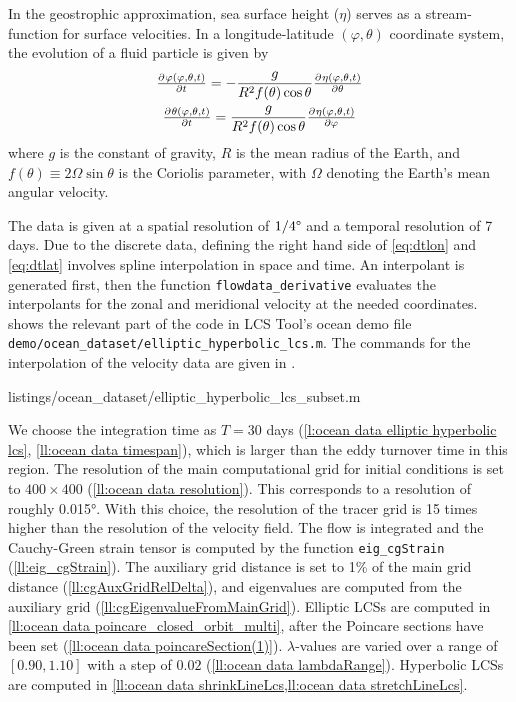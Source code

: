 \documentclass[5p]{elsarticle}
\begin{document}
In the geostrophic approximation, sea surface height ($\eta$) serves as a stream-function for surface velocities. In a longitude-latitude $(\varphi,\theta)$ coordinate system, the evolution of a fluid particle is given by
\begin{gather}
\pd{\varphi(\varphi,\theta,t)}{t} = -\frac{g}{R^2 f(\theta) \cos\theta} \pd{\eta(\varphi,\theta,t)}{\theta}\label{eq:dtlon}\\
\pd{\theta(\varphi,\theta,t)}{t} = \frac{g}{R^2 f(\theta) \cos\theta}\pd{\eta(\varphi,\theta,t)}{\varphi}
\label{eq:dtlat}
\end{gather}
where $g$ is the constant of gravity, $R$ is the mean radius of the Earth, and $f(\theta) \equiv 2\Omega\sin\theta$ is the Coriolis parameter, with $\Omega$ denoting the Earth's mean angular velocity.

The data is given at a spatial resolution of $1/4\degree$ and a temporal resolution of 7 days.
Due to the discrete data, defining the right hand side of \cref{eq:dtlon} and \cref{eq:dtlat} involves spline interpolation in space and time.
An interpolant is generated first, then the function \lstinline!flowdata_derivative! evaluates the interpolants for the zonal and meridional velocity at the needed coordinates.
 shows the relevant part of the code in LCS Tool's ocean demo file \lstinline!demo/ocean_dataset/elliptic_hyperbolic_lcs.m!.
The commands for the interpolation of the velocity data are given in .


        {listings/ocean_dataset/elliptic_hyperbolic_lcs_subset.m}

We choose the integration time as $T=30$ days (\cref{l:ocean data elliptic hyperbolic lcs}, \cref{ll:ocean data timespan}), which is larger than the eddy turnover time in this region.
The resolution of the main computational grid for initial conditions is set to $400 \times 400$ (\cref{ll:ocean data resolution}).
This corresponds to a resolution of roughly 0.015°.
With this choice, the resolution of the tracer grid is 15 times higher than the resolution of the velocity field.
The flow is integrated and the Cauchy-Green strain tensor is computed by the function \lstinline!eig_cgStrain! (\cref{ll:eig_cgStrain}).
The auxiliary grid distance is set to 1\% of the main grid distance (\cref{ll:cgAuxGridRelDelta}), and eigenvalues are computed from the auxiliary grid (\cref{ll:cgEigenvalueFromMainGrid}).
Elliptic LCSs are computed in \cref{ll:ocean data poincare_closed_orbit_multi}, after the Poincare sections have been set (\cref{ll:ocean data poincareSection(1)}).
$\lambda$-values are varied over a range of $[0.90,1.10]$ with a step of $0.02$ (\cref{ll:ocean data lambdaRange}).
Hyperbolic LCSs are computed in \cref{ll:ocean data shrinkLineLcs,ll:ocean data stretchLineLcs}.
\end{document}
